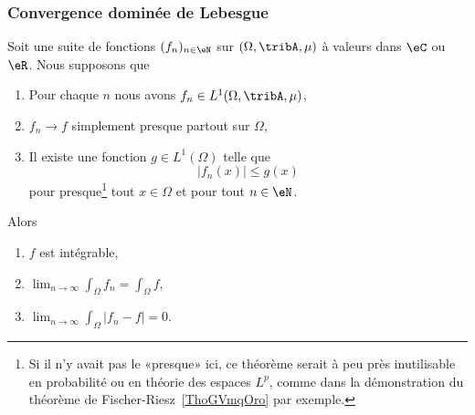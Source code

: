 \subsubsection{Convergence dominée de Lebesgue}

\begin{theorem}        \label{ThoConvDomLebVdhsTf}
	Soit une suite de fonctions \( (f_n)_{n\in \eN}\) sur \( (\Omega,\tribA,\mu)\) à valeurs dans \( \eC\) ou \( \eR\). Nous supposons que
	\begin{enumerate}
		\item
		      Pour chaque \( n\) nous avons \( f_n\in L^1(\Omega,\tribA,\mu)\),
		\item
		      \( f_n\to f\) simplement presque partout sur \( \Omega\),
		\item
		      Il existe une fonction \( g\in L^1(\Omega)\) telle que
		      \begin{equation}
			      | f_n(x) | \leq g(x)
		      \end{equation}
		      pour presque\footnote{Si il n'y avait pas le «presque» ici, ce théorème serait à peu près inutilisable en probabilité ou en théorie des espaces \( L^p\), comme dans la démonstration du théorème de Fischer-Riesz~\ref{ThoGVmqOro} par exemple.} tout \( x\in\Omega\) et pour tout \( n\in \eN\).
	\end{enumerate}
	Alors
	\begin{enumerate}
		\item
		      \( f\) est intégrable,
		\item
		      \( \lim_{n\to \infty} \int_{\Omega}f_n=\int_\Omega f\),
		\item
		      \( \lim_{n\to \infty} \int_{\Omega}| f_n-f |=0\).
	\end{enumerate}
\end{theorem}

